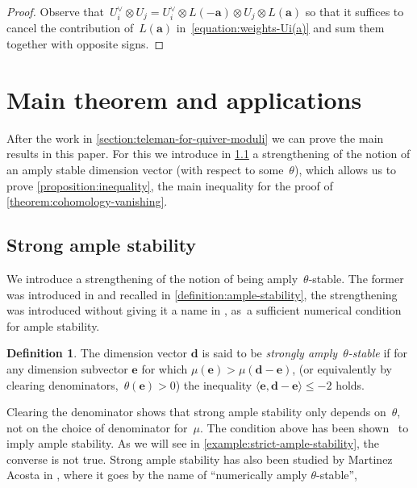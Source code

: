 \documentclass[JEP,XML,SOM,Unicode,NoEqCountersInSection,published]{cedram}
\theoremstyle{plain}
\theoremstyle{definition}
\newtheorem{definition}[theorem]{Definition}
\newcommand\tuple[1]{\ensuremath{{\boldsymbol{#1}}}}
\begin{document}
\begin{proof}
Observe that~$U_i^\vee\otimes U_j=U_i^\vee\otimes L(-\tuple{a})\otimes U_j\otimes L(\tuple{a})$
so that it suffices to cancel the contribution of~$L(\tuple{a})$ in~\eqref{equation:weights-Ui(a)}
and sum them together with opposite signs.
\end{proof}

\section{Main theorem and applications}
\label{section:results}
After the work in \cref{section:teleman-for-quiver-moduli}
we can prove the main results in this paper.
For this we introduce in \cref{subsection:strong-ample-stability}
a strengthening of the notion of
an amply stable dimension vector (with respect to some~$\theta$),
which allows us to prove \cref{proposition:inequality},
the main inequality for the proof of \cref{theorem:cohomology-vanishing}.

\subsection{Strong ample stability}
\label{subsection:strong-ample-stability}
We introduce a strengthening of the notion of being amply~$\theta$-stable.
The former was introduced in \cite[Def.\,4.1]{MR3683503}
and recalled in \cref{definition:ample-stability},
the strengthening was introduced without giving it a name in \cite[Prop.\,5.1]{MR3683503}, as~a sufficient numerical condition for ample stability.
\begin{definition}
\label{definition:strong-ample-stability}
The dimension vector $\tuple{d}$ is said to be \emph{strongly amply~$\theta$-stable}
if for any dimension subvector $\tuple{e}$ for which $\mu(\tuple{e}) > \mu(\tuple{d} - \tuple{e})$,
(or equivalently by clearing denominators,~$\theta(\tuple{e})>0$)
the inequality $\langle \tuple{e}, \tuple{d} - \tuple{e} \rangle \leq -2$ holds.
\end{definition}
Clearing the denominator shows that strong ample stability only depends on~$\theta$,
not on the choice of denominator for~$\mu$.
The condition above has been shown~\cite[Prop.\,5.1]{MR3683503} to imply ample stability.
As we will see in \cref{example:strict-ample-stability}, the converse is not true.
Strong ample stability has also been studied by Martinez Acosta in \cite{karen},
where it goes by the name of ``numerically amply $\theta$-stable'',
\end{document}
